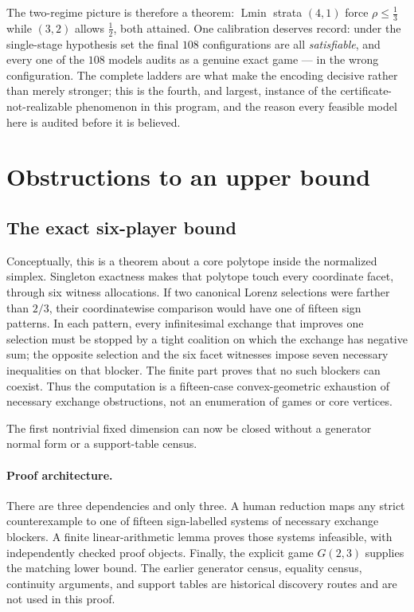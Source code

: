 \documentclass[11pt]{article}
\newcommand{\Lmin}{\operatorname{Lmin}}
\begin{document}
The two-regime picture is therefore a theorem: $\Lmin$ strata $(4,1)$
force $\rho\le\tfrac13$ while $(3,2)$ allows $\tfrac12$, both attained.
One calibration deserves record: under the single-stage hypothesis set the
final $108$ configurations are all \emph{satisfiable}, and every one of the
$108$ models audits as a genuine exact game --- in the wrong configuration.
The complete ladders are what make the encoding decisive rather than
merely stronger; this is the fourth, and largest, instance of the
certificate-not-realizable phenomenon in this program, and the reason
every feasible model here is audited before it is believed.

\section{Obstructions to an upper bound}\label{sec:obstruction}

\subsection{The exact six-player bound}

Conceptually, this is a theorem about a core polytope inside the normalized
simplex.  Singleton exactness makes that polytope touch every coordinate
facet, through six witness allocations.  If two canonical Lorenz selections
were farther than $2/3$, their coordinatewise comparison would have one of
fifteen sign patterns.  In each pattern, every infinitesimal exchange that
improves one selection must be stopped by a tight coalition on which the
exchange has negative sum; the opposite selection and the six facet
witnesses impose seven necessary inequalities on that blocker.  The finite
part proves that no such blockers can coexist.  Thus the computation is a
fifteen-case convex-geometric exhaustion of necessary exchange obstructions,
not an enumeration of games or core vertices.

The first nontrivial fixed dimension can now be closed without a generator
normal form or a support-table census.

\paragraph{Proof architecture.}
There are three dependencies and only three.  A human reduction maps any
strict counterexample to one of fifteen sign-labelled systems of necessary
exchange blockers.  A finite linear-arithmetic lemma proves those systems
infeasible, with independently checked proof objects.  Finally, the explicit
game $G(2,3)$ supplies the matching lower bound.  The earlier generator
census, equality census, continuity arguments, and support tables are
historical discovery routes and are not used in this proof.
\end{document}
